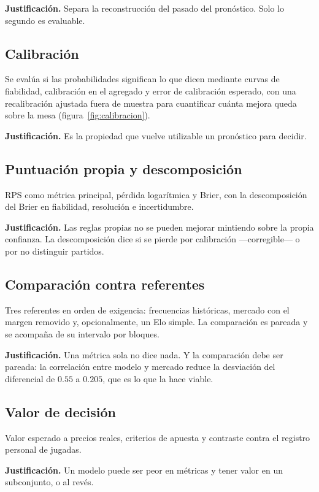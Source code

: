 \documentclass{pas}
\begin{document}
\textbf{Justificación.} Separa la reconstrucción del pasado del pronóstico. Solo lo segundo es evaluable.

\subsection{Calibración}
Se evalúa si las probabilidades significan lo que dicen mediante curvas de fiabilidad, calibración en el agregado y
error de calibración esperado, con una recalibración ajustada fuera de muestra para cuantificar cuánta mejora queda
sobre la mesa (figura~\ref{fig:calibracion}).

\textbf{Justificación.} Es la propiedad que vuelve utilizable un pronóstico para decidir.

\subsection{Puntuación propia y descomposición}
RPS como métrica principal, pérdida logarítmica y Brier, con la descomposición del Brier en fiabilidad, resolución
e incertidumbre.

\textbf{Justificación.} Las reglas propias no se pueden mejorar mintiendo sobre la propia confianza. La
descomposición dice si se pierde por calibración —corregible— o por no distinguir partidos.

\subsection{Comparación contra referentes}
Tres referentes en orden de exigencia: frecuencias históricas, mercado con el margen removido y, opcionalmente, un
Elo simple. La comparación es pareada y se acompaña de su intervalo por bloques.

\textbf{Justificación.} Una métrica sola no dice nada. Y la comparación debe ser pareada: la correlación entre
modelo y mercado reduce la desviación del diferencial de $0.55$ a $0.205$, que es lo que la hace viable.

\subsection{Valor de decisión}
Valor esperado a precios reales, criterios de apuesta y contraste contra el registro personal de jugadas.

\textbf{Justificación.} Un modelo puede ser peor en métricas y tener valor en un subconjunto, o al revés.

\end{document}
